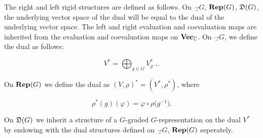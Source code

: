 \begin{defn} The right and left rigid structures are defined as follows. On $\Vec_G$, ${\bf Rep}(G)$, ${\mathfrak D}(G)$, the underlying vector space of the dual will be equal to the dual of the underlying vector space. The left and right evaluation and coevaluation maps are inherited from the evaluation and coevaluation maps on ${\bf Vec}_{{\mathbb C}}$. On $\Vec_G$, we define the dual as follows:

$$V^*=\bigoplus_{g\in G}V_{g^{-1}}^*.$$

On ${\bf Rep}(G)$ we define the dual as $(V,\rho)^*=(V^*,\rho^*)$, where

$$\rho^*(g)(\varphi)=\varphi\circ \rho\big(g^{-1}\big).$$

On ${\mathfrak D}(G)$ we inherit a structure of a $G$-graded $G$-representation on the dual $V^*$ by endowing with the dual structures defined on $\Vec_G$, ${\bf Rep}(G)$ seperately.
\end{defn}

